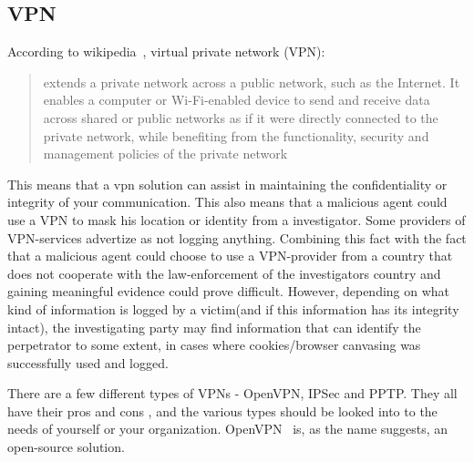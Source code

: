 \subsection{VPN}
 
According to wikipedia~\cite{wiki_vpn}, virtual private network (VPN):
\begin{quote}
extends a private network across a public network, such as the Internet. It enables a computer or Wi-Fi-enabled device to send and receive data across shared or public networks as if it were directly connected to the private network, while benefiting from the functionality, security and management policies of the private network
\end{quote}
This means that a vpn solution can assist in maintaining the confidentiality or integrity of your communication.
This also means that a malicious agent could use a VPN to mask his location or identity from a investigator. Some providers of VPN-services advertize as not logging anything. Combining this fact with the fact that a malicious agent could choose to use a VPN-provider from a country that does not cooperate with the law-enforcement of the investigators country and gaining meaningful evidence could prove difficult.
However, depending on what kind of information is logged by a victim(and if this information has its integrity intact), the investigating party may find information that can identify the perpetrator to some extent, in cases where cookies/browser canvasing was successfully used and logged.


There are a few different types of VPNs - OpenVPN, IPSec and PPTP. They all have their pros and cons , and the various types should be looked into to  the needs of yourself or your organization.
OpenVPN~\cite{open_vpn_wiki} is, as the name suggests, an open-source solution.
